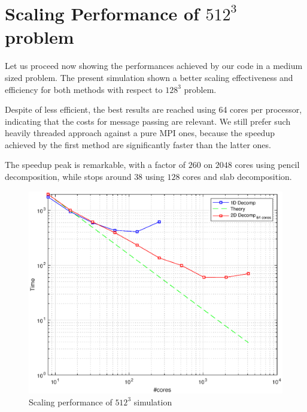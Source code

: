 \section{Scaling Performance of $512^3$ problem}
Let us proceed now showing the performances achieved by our code in a medium sized problem.
The present simulation shown a better scaling effectiveness and efficiency for both methods with respect to $128^{3}$ problem. 
\par
Despite of less efficient, the best results are reached using 64 cores per processor, indicating that the costs for message passing are relevant.
We still prefer such heavily threaded approach against a pure MPI ones, because the speedup achieved by the first method are significantly faster than the latter ones. \\
\par
The speedup peak is remarkable, with a factor of $260$ on $2048$ cores using pencil decomposition, while stops around $38$ using $128$ cores and slab decomposition. \\
\par

\begin{figure}
\begin{center}
\includegraphics[scale=0.6]{grafici/5121}
\caption{Scaling performance of $512^3$ simulation}
\label{5121}
\end{center}
\end{figure}

